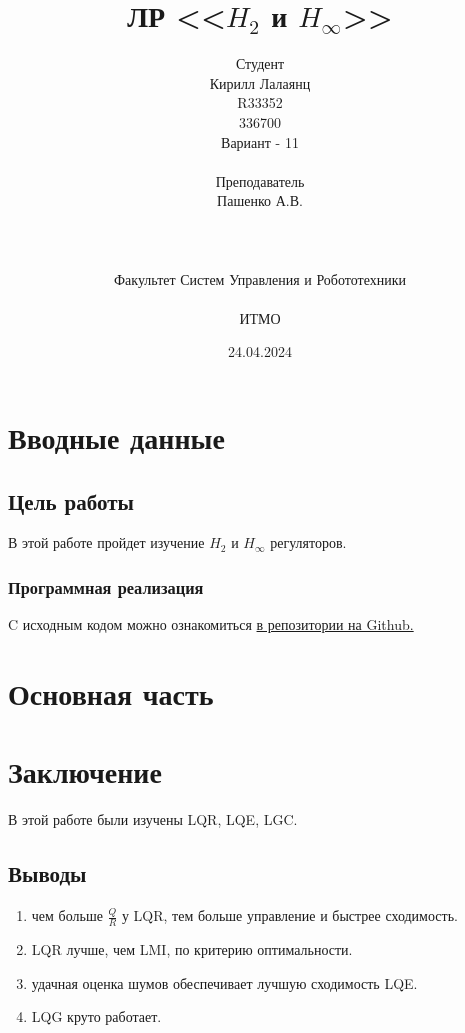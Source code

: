 \documentclass[16pt]{article}
\title{ЛР \textnumero 11 <<\(H_2\) и \(H_\infty\)>>}
\author{
Студент \\
Кирилл Лалаянц\\
R33352\\
336700\\
Вариант - 11\\
\\
Преподаватель\\
Пашенко А.В. \\
\\
\\
\\
Факультет Систем Управления и Робототехники\\
\\
ИТМО\\
}
\date{24.04.2024}
\begin{document}
\maketitle
\newpage
\tableofcontents
\thispagestyle{empty}

\newpage
\setcounter{page}{1}
\section{Вводные данные}
\subsection{Цель работы}
В этой работе пройдет изучение \(H_2\) и \(H_\infty\) регуляторов.

\subsubsection{Программная реализация}
C исходным кодом можно ознакомиться \href{https://github.com/lalayants/control-theory-itmo-2023-2024}{в репозитории на Github.}


\newpage
\section{Основная часть}

\FloatBarrier


\FloatBarrier

% 

% 

% 

\newpage
\section{Заключение}
В этой работе были изучены LQR, LQE, LGC.
\subsection{Выводы}
\begin{enumerate}
   \item чем больше \(\frac{Q}{R}\) у LQR, тем больше управление и быстрее сходимость.
   \item LQR лучше, чем LMI, по критерию оптимальности.
   \item удачная оценка шумов обеспечивает лучшую сходимость LQE.
   \item LQG круто работает.
\end{enumerate}
\end{document}
